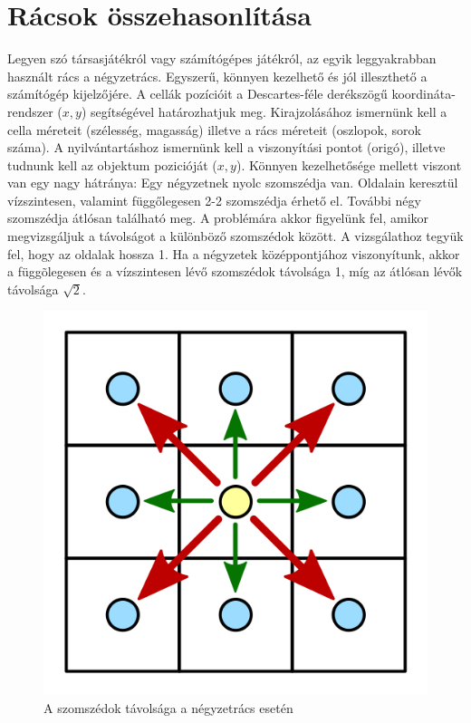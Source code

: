 
\section{Rácsok összehasonlítása}

Legyen szó társasjátékról vagy számítógépes játékról, az egyik leggyakrabban használt rács a négyzetrács. Egyszerű, könnyen kezelhető és jól illeszthető a számítógép kijelzőjére. A cellák pozícióit a Descartes-féle derékszögű koordináta-rendszer ($x, y$) segítségével határozhatjuk meg. Kirajzolásához ismernünk kell a cella méreteit (szélesség, magasság) illetve a rács méreteit (oszlopok, sorok száma). A nyilvántartáshoz ismernünk kell a viszonyítási pontot (origó), illetve tudnunk kell az objektum pozicióját ($x, y$).
\newline
\newline
Könnyen kezelhetősége mellett viszont van egy nagy hátránya:
Egy négyzetnek nyolc szomszédja van. Oldalain keresztül vízszintesen, valamint függőlegesen 2-2 szomszédja érhető el. További négy szomszédja átlósan található meg. A problémára akkor figyelünk fel, amikor megvizsgáljuk a távolságot a különböző szomszédok között. A vizsgálathoz tegyük fel, hogy az oldalak hossza 1. Ha a négyzetek középpontjához viszonyítunk, akkor a függõlegesen és a vízszintesen lévő szomszédok távolsága 1, míg az átlósan lévők távolsága $\sqrt{2}$.
\newline

\begin{figure}[h]
\centering
\includegraphics[scale=0.2]{kepek/img21.png}
\caption{A szomszédok távolsága a négyzetrács esetén}
\label{fig:img21}
\end{figure}

